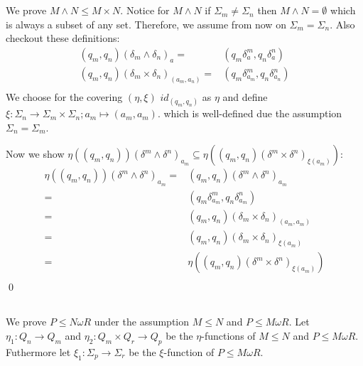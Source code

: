 \documentclass[a4paper,12pt,numbers=noenddot]{scrreport}
\begin{document}

\chapter{}
\section{}
We prove $M \land N \leq M \times N$. Notice for $M \land N$ if $\Sigma_m \neq \Sigma_n$ then $M \land N = \emptyset$ which is always a subset of any set.
Therefore, we assume from now on $\Sigma_m = \Sigma_n$.
Also checkout these definitions:
\begin{align*}
    (q_m, q_n) (\delta_m \land \delta_n)_a = & (q_m \delta^m_a, q_n \delta^n_a)  \label{eq1}\tag{1}\\
    (q_m, q_n) (\delta_m \times \delta_n)_{(a_m, a_n)} = & (q_m \delta^m_{a_m}, q_n \delta^n_{a_n})  \label{eq2}\tag{2}\\
\end{align*}
We choose for the covering $(\eta,\xi)$ $id_{(q_m, q_n)}$ as $\eta$ and define $\xi: \Sigma_n \rightarrow \Sigma_m \times \Sigma_n; a_m \mapsto (a_m, a_m)$.
which is well-defined due the assumption $\Sigma_n = \Sigma_m$.

Now we show $\eta((q_m, q_n)) (\delta^m \land \delta^n)_{a_m} \subseteq \eta((q_m,q_n) (\delta^m \times \delta^n)_{\xi(a_m)})$:
\begin{align*}
    \eta((q_m, q_n)) (\delta^m \land \delta^n)_{a_m} = & (q_m, q_n) (\delta^m \land \delta^n)_{a_m} \tag{def. $\eta$, 1}\\
                               = & (q_m \delta^m_{a_m}, q_n \delta^n_{a_m}) \tag{2}\\
                               = & (q_m, q_n) (\delta_m \times \delta_n)_{(a_m, a_m)} \tag{def. $\xi$}\\
                               = & (q_m, q_n) (\delta_m \times \delta_n)_{\xi(a_m)} \tag{def. $\eta$}\\
                               = & \eta((q_m,q_n) (\delta^m \times \delta^n)_{\xi(a_m)}) \\
\end{align*}
\qed
\section{}
\section{}
We prove $P \leq N \omega R$ under the assumption $M \leq N$ and $P \leq M \omega R$.
Let $\eta_1: Q_n \rightarrow Q_m$ and $\eta_2: Q_m \times Q_r \rightarrow Q_p$ be the $\eta$-functions of $M \leq N$ and $P \leq M \omega R$.
Futhermore let $\xi_1: \Sigma_p \rightarrow \Sigma_r$ be the $\xi$-function of $P \leq M \omega R$.
\end{document}
